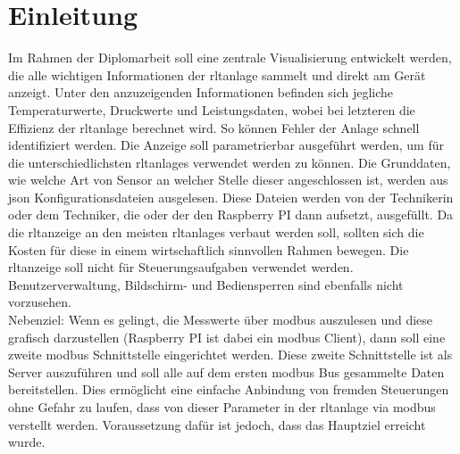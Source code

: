 \chapter{Einleitung} 
\label{aufgabenstellung}
\noindent Im Rahmen der Diplomarbeit soll eine zentrale Visualisierung entwickelt werden, die alle wichtigen Informationen der \ac{rltanlage} sammelt und direkt am Gerät anzeigt. Unter den anzuzeigenden Informationen befinden sich jegliche Temperaturwerte, Druckwerte und Leistungsdaten, wobei bei letzteren die Effizienz der \ac{rltanlage} berechnet wird. So können Fehler der Anlage schnell identifiziert werden.
Die Anzeige soll parametrierbar ausgeführt werden, um für die unterschiedlichsten 
\acp{rltanlage} verwendet werden zu können. Die Grunddaten, wie \zB welche Art von 
Sensor \bzw an welcher Stelle dieser angeschlossen ist, werden aus \ac{json} Konfigurationsdateien ausgelesen. Diese Dateien werden von der Technikerin oder dem Techniker, die oder der den Raspberry PI dann aufsetzt, ausgefüllt.
Da die \ac{rltanzeige} an den meisten \acp{rltanlage} verbaut werden soll, sollten sich die Kosten für diese in einem wirtschaftlich sinnvollen Rahmen bewegen.
Die \ac{rltanzeige} soll nicht für Steuerungsaufgaben verwendet werden. Benutzerverwaltung, 
Bildschirm- und Bediensperren sind ebenfalls nicht vorzusehen. \\

Nebenziel:
Wenn es gelingt, die Messwerte über \gls{modbus} auszulesen und diese grafisch darzustellen (Raspberry PI ist dabei ein \gls{modbus} Client), dann soll eine zweite \gls{modbus} Schnittstelle eingerichtet werden. Diese zweite Schnittstelle ist als Server auszuführen und soll alle auf dem ersten \gls{modbus} Bus gesammelte Daten bereitstellen. Dies ermöglicht eine einfache Anbindung von fremden Steuerungen ohne Gefahr zu laufen, dass von dieser Parameter in der \ac{rltanlage} via \gls{modbus} verstellt werden. Voraussetzung dafür ist jedoch, dass das Hauptziel erreicht wurde.

